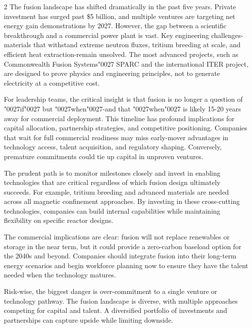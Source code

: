 \documentclass[10pt,a4paper]{article}
\newcommand{\BOApos}{{\BOQuoteFont\char"0027}}
\begin{document}
\begin{multicols}{2}
{\small The fusion landscape has shifted dramatically in the past five years. Private investment has surged past \$5 billion, and multiple ventures are targeting net energy gain demonstrations by 2027. However, the gap between a scientific breakthrough and a commercial power plant is vast. Key engineering challenges-materials that withstand extreme neutron fluxes, tritium breeding at scale, and efficient heat extraction-remain unsolved. The most advanced projects, such as Commonwealth Fusion Systems\BOApos{} SPARC and the international ITER project, are designed to prove physics and engineering principles, not to generate electricity at a competitive cost.}\par
{\small For leadership teams, the critical insight is that fusion is no longer a question of \BOApos{}if\BOApos{} but \BOApos{}when\BOApos{}-and that \BOApos{}when\BOApos{} is likely 15-20 years away for commercial deployment. This timeline has profound implications for capital allocation, partnership strategies, and competitive positioning. Companies that wait for full commercial readiness may miss early-mover advantages in technology access, talent acquisition, and regulatory shaping. Conversely, premature commitments could tie up capital in unproven ventures.}\par
{\small The prudent path is to monitor milestones closely and invest in enabling technologies that are critical regardless of which fusion design ultimately succeeds. For example, tritium breeding and advanced materials are needed across all magnetic confinement approaches. By investing in these cross-cutting technologies, companies can build internal capabilities while maintaining flexibility on specific reactor designs.}\par
{\small The commercial implications are clear: fusion will not replace renewables or storage in the near term, but it could provide a zero-carbon baseload option for the 2040s and beyond. Companies should integrate fusion into their long-term energy scenarios and begin workforce planning now to ensure they have the talent needed when the technology matures.}\par
{\small Risk-wise, the biggest danger is over-commitment to a single venture or technology pathway. The fusion landscape is diverse, with multiple approaches competing for capital and talent. A diversified portfolio of investments and partnerships can capture upside while limiting downside.}\par
\end{multicols}
\label{chap:1:end}
\end{document}
